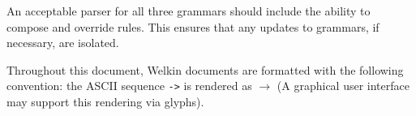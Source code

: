 An acceptable parser for all three grammars should include the ability to compose and override rules. This ensures that any updates to grammars, if necessary, are isolated.

Throughout this document, Welkin documents are formatted with the following convention: the ASCII sequence \texttt{->} is rendered as $\to$ (A graphical user interface may support this rendering via glyphs). %


